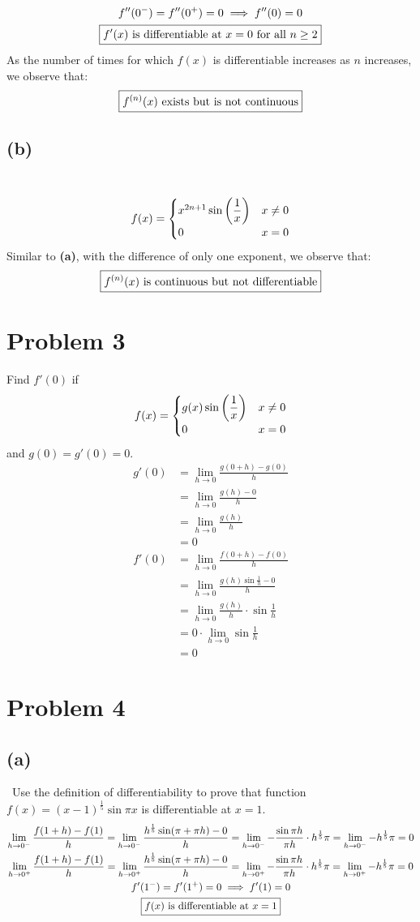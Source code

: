 \documentclass[12pt]{article}
\newcommand*{\paren}[1]{\ensuremath\left(#1\right)}
\newcommand{\problem}[1]{\section{Problem #1}}
\newcommand{\subproblem}[1]{\subsection{(#1)} \,}
\begin{document}
\begin{gather*}
    f''(0^-)=f''(0^+)=0 \implies f''(0)=0\\
    \boxed{f'(x) $ is differentiable at $ x=0 $ for all $ n \ge 2}
\end{gather*}
As the number of times for which $f(x)$ is differentiable increases as $n$ increases, we observe that:
\[
\boxed{f^{(n)}(x) $ exists but is not continuous$}
\]

\subproblem{b}
\[
f(x)=\begin{cases}
    x^{2n+1} \sin \paren{ \dfrac{1}{x}} &x\ne 0\\
    0 &x=0
\end{cases}
\]
Similar to \textbf{(a)}, with the difference of only one exponent, we observe that:
\[
\boxed{f^{(n)}(x) $ is continuous but not differentiable$}
\]

\problem{3}
Find $f'(0)$ if
\[
f(x)=\begin{cases}
    g(x)\sin \paren{ \dfrac{1}{x}} &x\ne 0\\
    0 &x=0
\end{cases}
\]
and $g(0)=g'(0)=0.$
\begin{align*}
    g'(0)
    &=\lim_{h \to 0} \frac{g(0+h)-g(0)}{h}\\
    &=\lim_{h \to 0}\frac{g(h)-0}{h}\\
    &=\lim_{h \to 0} \frac{g(h)}{h}\\
    &=0\\
    f'(0)
    &=\lim_{h \to 0}\frac{f(0+h)-f(0)}{h}\\
    &=\lim_{h \to 0} \frac{g(h)\sin \frac{1}{h}-0}{h}\\
    &=\lim_{h \to 0} \frac{g(h)}{h} \cdot \sin \frac{1}{h}\\
    &=0 \cdot \lim_{h \to 0} \sin \frac{1}{h}\\
    &=\boxed{0}
\end{align*}

\problem{4} \vspace{-0.3em}
\subproblem{a} Use the definition of differentiability to prove that function $f(x)=(x-1)^\frac{1}{5}\sin \pi x$ is differentiable at $x = 1$.
\begin{gather*}
    \lim_{h \to 0^-} \frac{f(1+h)-f(1)}{h}=\lim_{h \to 0^-} \frac{h^{\frac{1}{5}}\sin(\pi+\pi h)-0}{h}=\lim_{h \to 0^-} -\frac{\sin \pi h}{\pi h}\cdot h^\frac{1}{5}\pi=\lim_{h \to 0^-}-h^\frac{1}{5}\pi=0\\
    \lim_{h \to 0^+} \frac{f(1+h)-f(1)}{h}=\lim_{h \to 0^+} \frac{h^{\frac{1}{5}}\sin(\pi+\pi h)-0}{h}=\lim_{h \to 0^+} -\frac{\sin \pi h}{\pi h}\cdot h^\frac{1}{5}\pi=\lim_{h \to 0^+}-h^\frac{1}{5}\pi=0\\
    f'(1^-)=f'(1^+)=0 \implies f'(1)=0\\
    \boxed{f(x) $ is differentiable at $ x=1}
\end{gather*}
\end{document}
